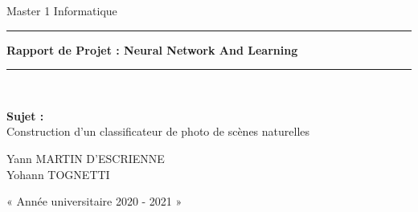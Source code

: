 \documentclass[12pt ,a4paper ]{article}
\begin{document}
	\begin{titlepage}
		
		\vspace{0.5cm}
		\begin{center}		
			{\Large  Master 1 Informatique}
		\end{center}
		\vspace{1cm}
		
		\rule{1\linewidth}{1.1pt}\newline   %
		\begin{center}
			 {\Huge \textbf{Rapport de Projet : Neural Network And Learning}}
		\end{center}
		\rule{1\linewidth}{1.1pt} \\
		
		\begin{center}
		\begin{LARGE}
		\textbf{Sujet :} \\\vspace{0.6cm}  Construction d'un classificateur de photo de scènes naturelles
		\end{LARGE}
		\end{center}
		
		\vspace{0.5cm}
		\begin{center}	
				\begin{Large}
				Yann MARTIN D'ESCRIENNE \\ 
				Yohann TOGNETTI \\ 
				\end{Large}
		\end{center}
		\vspace{6cm}
		
		\begin{center}
			{\large « Année universitaire 2020 - 2021 »}
		\end{center}
		

\end{titlepage}

\newpage
\tableofcontents 
				
\newpage
\end{document}
